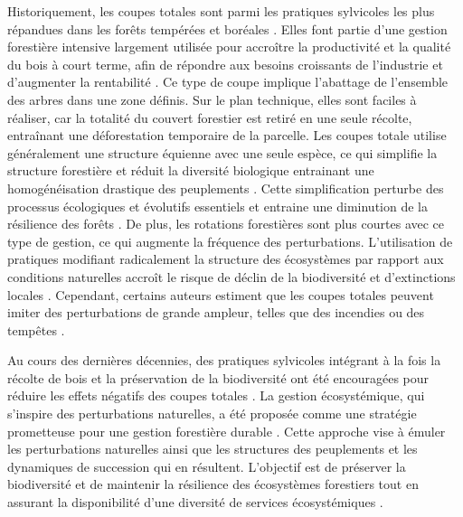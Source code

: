 Historiquement, les coupes totales sont parmi les pratiques sylvicoles les plus répandues dans les forêts tempérées et boréales \citep{Fedrowitz2014Canretention,Chaudhary2016Impactforest}. 
Elles font partie d'une gestion forestière intensive largement utilisée pour accroître la productivité et la qualité du bois à court terme, afin de répondre aux besoins croissants de l'industrie et d'augmenter la rentabilité \citep{Irland2011TimberProductivitya}.
Ce type de coupe implique l'abattage de l'ensemble des arbres dans une zone définis.
Sur le plan technique, elles sont faciles à réaliser, car la totalité du couvert forestier est retiré en une seule récolte, entraînant une déforestation temporaire de la parcelle.
Les coupes totale utilise généralement une structure équienne avec une seule espèce, ce qui simplifie la structure forestière et réduit la diversité biologique entrainant une homogénéisation drastique des peuplements \citep{Rosenvald2008whatwhen}. 
Cette simplification perturbe des processus écologiques et évolutifs essentiels et entraine une diminution de la résilience des forêts \citep{Holling2001UnderstandingComplexity}. 
De plus, les rotations forestières sont plus courtes avec ce type de gestion, ce qui augmente la fréquence des perturbations. 
L’utilisation de pratiques modifiant radicalement la structure des écosystèmes par rapport aux conditions naturelles accroît le risque de déclin de la biodiversité et d’extinctions locales \citep{Hanski2000Extinctiondebt}.  
Cependant, certains auteurs estiment que les coupes totales peuvent imiter des perturbations de grande ampleur, telles que des incendies ou des tempêtes \citep{Greenberg1995comparisonbird}. 

Au cours des dernières décennies, des pratiques sylvicoles intégrant à la fois la récolte de bois et la préservation de la biodiversité ont été encouragées pour réduire les effets négatifs des coupes totales \citep{Gustafsson2012Retentionforestry}.
La gestion écosystémique, qui s'inspire des perturbations naturelles, a été proposée comme une stratégie prometteuse pour une gestion forestière durable \citep{Perry1998scientificbasis,Kuuluvainen2002Naturalvariabilitya}. 
Cette approche vise à émuler les perturbations naturelles ainsi que les structures des peuplements et les dynamiques de succession qui en résultent.  
L'objectif est de préserver la biodiversité et de maintenir la résilience des écosystèmes forestiers tout en assurant la disponibilité d'une diversité de services écosystémiques \citep{Szaro1998emergenceecosystem,MacDicken2015Globalprogress}.

